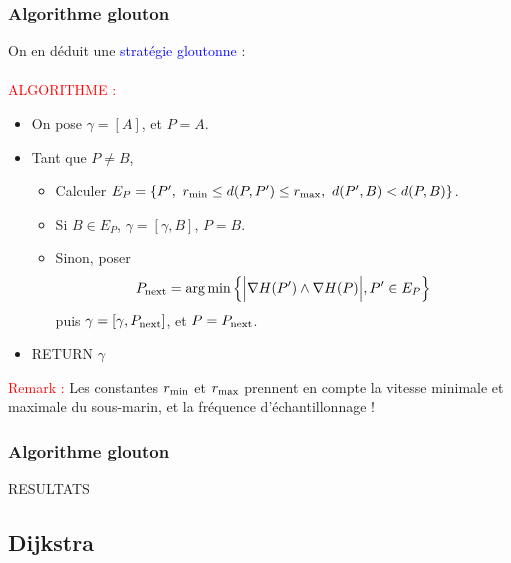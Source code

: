 \documentclass[11pt]{beamer}
\DeclareMathOperator*{\argmin}{arg\,min}
\begin{document}



\begin{frame}

\frametitle{Algorithme glouton}

On en déduit une \textcolor{blue}{stratégie gloutonne} : \\
~\\
\textcolor{red}{ALGORITHME :}\\
\begin{itemize}
    \item On pose $\gamma = [A]$, et $P = A$.
    \item Tant que $P \neq B$,
    \begin{itemize}
        \item Calculer $E_P = \{P', \ r_{\rm min} \le d(P, P') \le r_{\rm max}, \ d(P', B) < d(P, B) \}$.
        \item Si $B \in E_P$, $\gamma = [\gamma, B]$, $P = B$.
        \item Sinon, poser
        \[
            P_{\rm next} = \argmin \left\{ \Big| \nabla H(P') \wedge \nabla H(P) \Big|, P' \in E_P    \right\}
        \]
        puis $\gamma = [\gamma, P_{\rm next}]$, et $P = P_{\rm next}$.
    \end{itemize}
    \item RETURN $\gamma$
\end{itemize}

\textcolor{red}{Remark :}
Les constantes $r_{\rm min}$ et $r_{\rm max}$ prennent en compte la vitesse minimale et maximale du sous-marin, et la fréquence d'échantillonnage !


\end{frame}



\begin{frame}

\frametitle{Algorithme glouton}

RESULTATS
\end{frame}
\subsection{Dijkstra}
\end{document}
